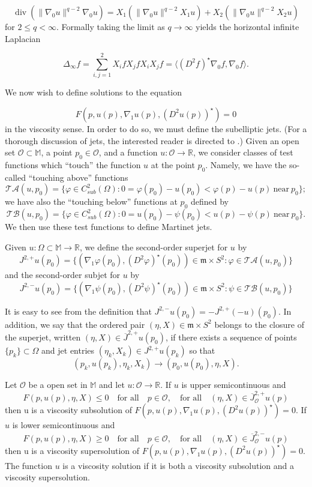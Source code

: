 \documentclass[reqno]{amsart}
\renewcommand{\div}{\operatorname{div}}
\begin{document}
\[\div(\|\nabla_0u\|^{q-2}\nabla_0u)=X_1(\|\nabla_0u\|^{q-2}X_1u)+X_2(\|\nabla_0u\|^{q-2}X_2u)\] 
for $2\leq q<\infty$. Formally taking the limit as $q\to\infty$ yields the horizontal infinite Laplacian


\[\Delta_{\infty}f=\sum_{i,j=1}^2X_ifX_jfX_iX_jf=\langle(D^2f)^\star\nabla_0f,\nabla_0f\rangle.\]


We now wish to define solutions to the equation

\[F(p,u(p),\nabla_1u(p),(D^2u(p))^\star)=0\]
in the viscosity sense. In order to do so, we must define the subelliptic jets. (For a thorough discussion of jets, the interested reader is directed to \cite{CIL:UGTVS}.) Given an open set $\mathcal{O}\subset\mathbb{M}$, a point $p_0\in\mathcal{O}$, and a function $u: \mathcal{O}\to\mathbb{R}$, we consider classes of test functions which ``touch” the function $u$ at the point $p_0$. Namely, we have the so-called ``touching above”
functions
\[\mathcal{TA}(u,p_0)=\{\varphi\in C_{sub}^2(\Omega):0 = \varphi(p_0)-u(p_0) <\varphi(p)-u(p)\:\text{near}\: p_0\};\]
we have also the ``touching below” functions at $p_0$ defined by
\[\mathcal{TB}(u,p_0)=\{\varphi\in C_{sub}^2(\Omega): 0 = u(p_0)-\psi(p_0) <u(p)-\psi(p)\:\text{near}\: p_0\}.\]
We then use these test functions to define Martinet jets.
\begin{definition}
Given $u:\Omega\subset \mathbb{M}\to\mathbb{R}$, we define the second-order superjet for $u$ by
\[J^{2,+} u(p_0)=\{(\nabla_1\varphi(p_0),(D^2\varphi)^\star(p_0))\in\mathfrak{m}\times S^2:\varphi\in\mathcal{TA}(u,p_0)\}\]
and the second-order subjet for $u$ by 
\[J^{2,-} u(p_0)=\{(\nabla_1\psi(p_0),(D^2\psi)^\star(p_0))\in\mathfrak{m}\times S^2:\psi\in\mathcal{TB}(u,p_0)\}\]
\end{definition}
It is easy to see from the definition that $J^{2,-}u(p_0)=-J^{2,+}(-u)(p_0)$. In addition, we say that the ordered pair
$(\eta,X)\in \mathfrak{m}\times S^2$ belongs to the closure of the superjet, written $(\eta,X)\in \overline{J}^{2,+} u(p_0)$, if there exists a sequence of points 
$\{p_k\}\subset\Omega$ and jet entries $(\eta_k,X_k)\in J^{2,+}u(p_k)$ so that
\[(p_k,u(p_k),\eta_k,X_k)\to(p_0,u(p_0),\eta,X).\]


\begin{definition}
Let $\mathcal{O}$ be a open set in $\mathbb{M}$ and let $u:\mathcal{O}\to\mathbb{R}$. If $u$ is upper semicontinuous and 
\[F(p,u(p),\eta,X)\leq0\quad\text{for all}\quad p\in\mathcal{O},\quad\text{for all}\quad (\eta,X)\in \overline{J}^{2,+}_{\mathcal{O}}u(p)\]
then u is a viscosity subsolution of $F(p,u(p),\nabla_1u(p),(D^2u(p))^\star)=0.$
If $u$ is lower semicontinuous and 
\[F(p,u(p),\eta,X)\geq0\quad\text{for all}\quad p\in\mathcal{O},\quad\text{for all}\quad (\eta,X)\in \overline{J}^{2,-}_{\mathcal{O}}u(p)\]
then u is a viscosity supersolution of $F(p,u(p),\nabla_1u(p),(D^2u(p))^\star)=0.$\\
The function $u$ is a viscosity solution if it is both a viscosity subsolution and a viscosity supersolution. 
\end{definition}
\end{document}
